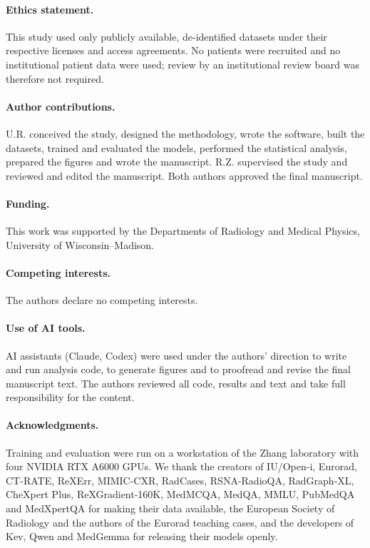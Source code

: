 \documentclass[11pt]{article}
\begin{document}
\paragraph{Ethics statement.} This study used only publicly available, de-identified datasets under their respective licenses and access agreements. No patients were recruited and no institutional patient data were used; review by an institutional review board was therefore not required.

\paragraph{Author contributions.} U.R. conceived the study, designed the methodology, wrote the software, built the datasets, trained and evaluated the models, performed the statistical analysis, prepared the figures and wrote the manuscript. R.Z. supervised the study and reviewed and edited the manuscript. Both authors approved the final manuscript.

\paragraph{Funding.} This work was supported by the Departments of Radiology and Medical Physics, University of Wisconsin--Madison.

\paragraph{Competing interests.} The authors declare no competing interests.

\paragraph{Use of AI tools.} AI assistants (Claude, Codex) were used under the authors' direction to write and run analysis code, to generate figures and to proofread and revise the final manuscript text. The authors reviewed all code, results and text and take full responsibility for the content.

\paragraph{Acknowledgments.} Training and evaluation were run on a workstation of the Zhang laboratory with four NVIDIA RTX A6000 GPUs. We thank the creators of IU/Open-i, Eurorad, CT-RATE, ReXErr, MIMIC-CXR, RadCases, RSNA-RadioQA, RadGraph-XL, CheXpert Plus, ReXGradient-160K, MedMCQA, MedQA, MMLU, PubMedQA and MedXpertQA for making their data available, the European Society of Radiology and the authors of the Eurorad teaching cases, and the developers of Kev, Qwen and MedGemma for releasing their models openly.
\end{document}
